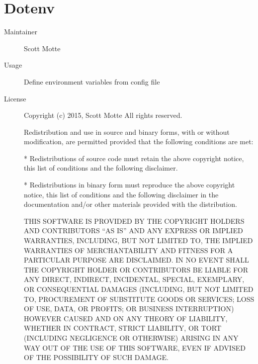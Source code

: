   \section*{Dotenv}
    \begin{description}
      \item[Maintainer] Scott Motte
      \item[Usage] Define environment variables from config file
      \item[License] \scriptsize Copyright (c) 2015, Scott Motte
        All rights reserved.

        Redistribution and use in source and binary forms, with or without
        modification, are permitted provided that the following conditions are met:

        * Redistributions of source code must retain the above copyright notice, this
          list of conditions and the following disclaimer.

        * Redistributions in binary form must reproduce the above copyright notice,
          this list of conditions and the following disclaimer in the documentation
          and/or other materials provided with the distribution.

        THIS SOFTWARE IS PROVIDED BY THE COPYRIGHT HOLDERS AND CONTRIBUTORS ``AS IS''
        AND ANY EXPRESS OR IMPLIED WARRANTIES, INCLUDING, BUT NOT LIMITED TO, THE
        IMPLIED WARRANTIES OF MERCHANTABILITY AND FITNESS FOR A PARTICULAR PURPOSE ARE
        DISCLAIMED. IN NO EVENT SHALL THE COPYRIGHT HOLDER OR CONTRIBUTORS BE LIABLE
        FOR ANY DIRECT, INDIRECT, INCIDENTAL, SPECIAL, EXEMPLARY, OR CONSEQUENTIAL
        DAMAGES (INCLUDING, BUT NOT LIMITED TO, PROCUREMENT OF SUBSTITUTE GOODS OR
        SERVICES; LOSS OF USE, DATA, OR PROFITS; OR BUSINESS INTERRUPTION) HOWEVER
        CAUSED AND ON ANY THEORY OF LIABILITY, WHETHER IN CONTRACT, STRICT LIABILITY,
        OR TORT (INCLUDING NEGLIGENCE OR OTHERWISE) ARISING IN ANY WAY OUT OF THE USE
        OF THIS SOFTWARE, EVEN IF ADVISED OF THE POSSIBILITY OF SUCH DAMAGE.
    \end{description}

